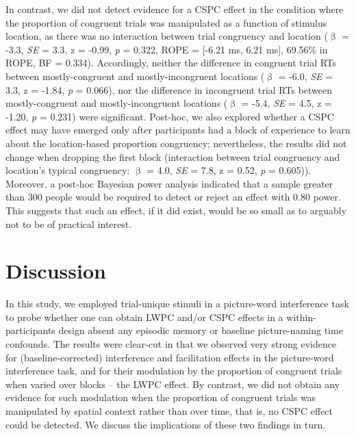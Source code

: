 \documentclass[
  ,man,floatsintext]{apa6}
\begin{document}
In contrast, we did not detect evidence for a CSPC effect in the condition where the proportion of congruent trials was manipulated as a function of stimulus location, as there was no interaction between trial congruency and location (\(\upbeta\) = -3.3, \emph{SE} = 3.3, z = -0.99, \emph{p} = 0.322, ROPE = {[}-6.21 ms, 6.21 ms{]}, 69.56\% in ROPE, BF = 0.334). Accordingly, neither the difference in congruent trial RTs between mostly-congruent and mostly-incongruent locations (\(\upbeta\) = -6.0, \emph{SE} = 3.3, z = -1.84, \emph{p} = 0.066), nor the difference in incongruent trial RTs between mostly-congruent and mostly-incongruent locations (\(\upbeta\) = -5.4, \emph{SE} = 4.5, z = -1.20, \emph{p} = 0.231) were significant. Post-hoc, we also explored whether a CSPC effect may have emerged only after participants had a block of experience to learn about the location-based proportion congruency; nevertheless, the results did not change when dropping the first block (interaction between trial congruency and location's typical congruency: \(\upbeta\) = 4.0, \emph{SE} = 7.8, z = 0.52, \emph{p} = 0.605)). Moreover, a post-hoc Bayesian power analysis indicated that a sample greater than 300 people would be required to detect or reject an effect with 0.80 power. This suggests that such an effect, if it did exist, would be so small as to arguably not to be of practical interest.

\hypertarget{discussion}{%
\section{Discussion}\label{discussion}}

In this study, we employed trial-unique stimuli in a picture-word interference task to probe whether one can obtain LWPC and/or CSPC effects in a within-participants design absent any episodic memory or baseline picture-naming time confounds. The results were clear-cut in that we observed very strong evidence for (baseline-corrected) interference and facilitation effects in the picture-word interference task, and for their modulation by the proportion of congruent trials when varied over blocks -- the LWPC effect. By contrast, we did not obtain any evidence for such modulation when the proportion of congruent trials was manipulated by spatial context rather than over time, that is, no CSPC effect could be detected. We discuss the implications of these two findings in turn.
\end{document}
